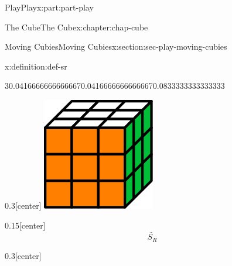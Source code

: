 \documentclass[oneside,10pt,]{book}
\numberwithin{equation}{section}
\begin{document}
\begin{partptx}{Play}{}{Play}{}{}{x:part:part-play}
\begin{chapterptx}{The Cube}{}{The Cube}{}{}{x:chapter:chap-cube}
\begin{sectionptx}{Moving Cubies}{}{Moving Cubies}{}{}{x:section:sec-play-moving-cubies}
\begin{definition}{}{x:definition:def-sr}
\begin{sidebyside}{3}{0.0416666666666667}{0.0416666666666667}{0.0833333333333333}
\begin{sbspanel}{0.3}[center]
\includegraphics[width=\linewidth]{./images/solved_cube.svg}
\end{sbspanel}%
\begin{sbspanel}{0.15}[center]%
%
\begin{equation*}
\underrightarrow{\quad S_R\quad}
\end{equation*}
%
\end{sbspanel}%
\begin{sbspanel}{0.3}[center]%

\end{sbspanel}
\end{sidebyside}
\end{definition}
\end{sectionptx}
\end{chapterptx}
\end{partptx}
\end{document}
